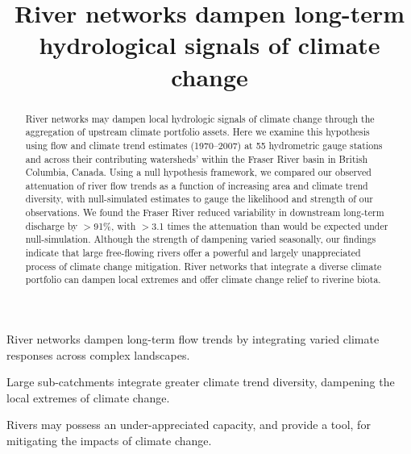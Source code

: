 \documentclass[draft,linenumbers]{AGUJournal}
\begin{document}

\title{River networks dampen long-term hydrological signals of climate change}







\begin{keypoints}
\item River networks dampen long-term flow trends by integrating varied climate responses across complex landscapes.
\item Large sub-catchments integrate greater climate trend diversity, dampening the local extremes of climate change.
\item Rivers may possess an under-appreciated capacity, and provide a tool, for mitigating the impacts of climate change.
\end{keypoints}


\begin{abstract}
	River networks may dampen local hydrologic signals of climate change through the aggregation of upstream climate portfolio assets. Here we examine this hypothesis using flow and climate trend estimates (1970--2007) at 55 hydrometric gauge stations and across their contributing watersheds' within the Fraser River basin in British Columbia, Canada. Using a null hypothesis framework, we compared our observed attenuation of river flow trends as a function of increasing area and climate trend diversity, with null-simulated estimates to gauge the likelihood and strength of our observations. We found the Fraser River reduced variability in downstream long-term discharge by $>$91\%, with $>$3.1 times the attenuation than would be expected under null-simulation. Although the strength of dampening varied seasonally, our findings indicate that large free-flowing rivers offer a powerful and largely unappreciated process of climate change mitigation. River networks that integrate a diverse climate portfolio can dampen local extremes and offer climate change relief to riverine biota.
\end{abstract}
\end{document}
